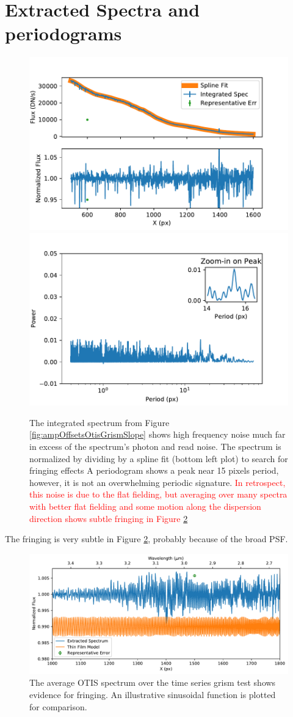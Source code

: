 \documentclass[]{aastex62}
\begin{document}
\section{Extracted Spectra and periodograms}


\begin{figure}[!hbtp]
\centering
\includegraphics[width=.49\columnwidth]{otis_spec_and_norm.pdf}
\includegraphics[width=.49\columnwidth]{otis_spec_periodogram.pdf}
\caption{The integrated spectrum from Figure \ref{fig:ampOffsetsOtisGrismSlope} shows high frequency noise much far in excess of the spectrum's photon and read noise.
The spectrum is normalized by dividing by a spline fit (bottom left plot) to search for fringing effects
A periodogram shows a peak near 15 pixels period, however, it is not an overwhelming periodic signature.
\textcolor{red}{In retrospect, this noise is due to the flat fielding, but averaging over many spectra with better flat fielding and some motion along the dispersion direction shows subtle fringing in Figure \ref{fig:avgOtisGrismSpecFringing}}
}\label{fig:integratedOtisGrismSpec}
\end{figure}

The fringing is very subtle in Figure \ref{fig:avgOtisGrismSpecFringing}, probably because of the broad PSF.

\begin{figure}[!hbtp]
\centering
\includegraphics[width=.99\columnwidth]{fringing_grism_otis.pdf}
\caption{The average OTIS spectrum over the time series grism test shows evidence for fringing.
An illustrative sinusoidal function is plotted for comparison.
}\label{fig:avgOtisGrismSpecFringing}
\end{figure}
\end{document}

